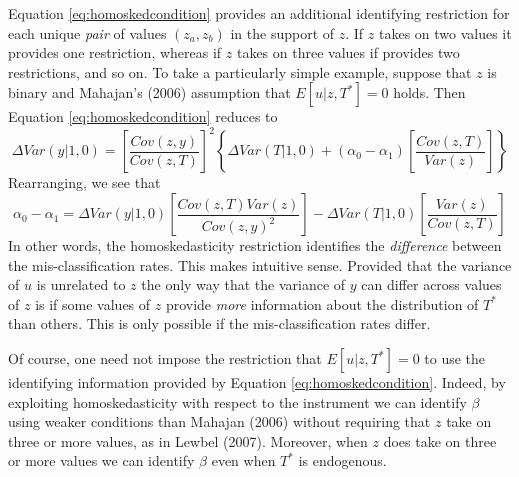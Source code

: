 Equation \ref{eq:homoskedcondition} provides an additional identifying restriction for each unique \emph{pair} of values $(z_a,z_b)$ in the support of $z$.
If $z$ takes on two values it provides one restriction, whereas if $z$ takes on three values if provides two restrictions, and so on.
To take a particularly simple example, suppose that $z$ is binary and Mahajan's (2006) assumption that $E[u|z,T^*] = 0$ holds.
Then Equation \ref{eq:homoskedcondition} reduces to
\begin{equation*}
  \Delta Var(y|1,0) = \left[ \frac{Cov(z,y)}{Cov(z,T)} \right]^2 \left\{\Delta Var(T|1,0) + (\alpha_0 - \alpha_1) \left[ \frac{Cov(z,T)}{Var(z)} \right]  \right\}
\end{equation*}
Rearranging, we see that
\begin{equation*}
  \alpha_0 - \alpha_1 = \Delta Var(y|1,0) \left[ \frac{Cov(z,T)Var(z)}{Cov(z,y)^2} \right] - \Delta Var(T|1,0)\left[ \frac{Var(z)}{Cov(z,T)} \right] 
\end{equation*}
In other words, the homoskedasticity restriction identifies the \emph{difference} between the mis-classification rates.
This makes intuitive sense.
Provided that the variance of $u$ is unrelated to $z$ the only way that the variance of $y$ can differ across values of $z$ is if some values of $z$ provide \emph{more} information about the distribution of $T^*$ than others.
This is only possible if the mis-classification rates differ.

Of course, one need not impose the restriction that $E[u|z,T^*]=0$ to use the identifying information provided by Equation \ref{eq:homoskedcondition}.
Indeed, by exploiting homoskedasticity with respect to the instrument we can identify $\beta$ using weaker conditions than Mahajan (2006) without requiring that $z$ take on three or more values, as in Lewbel (2007).
Moreover, when $z$ does take on three or more values we can identify $\beta$ even when $T^*$ is endogenous.

